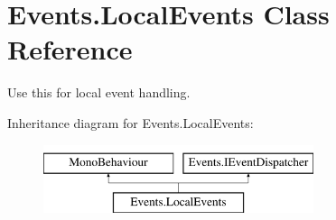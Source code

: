 \hypertarget{class_events_1_1_local_events}{}\section{Events.\+Local\+Events Class Reference}
\label{class_events_1_1_local_events}


Use this for local event handling.  


Inheritance diagram for Events.\+Local\+Events\+:\begin{figure}[H]
\begin{center}
\leavevmode
\includegraphics[height=2.000000cm]{class_events_1_1_local_events}
\end{center}
\end{figure}
